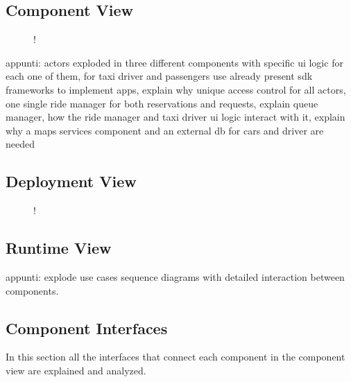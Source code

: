 \subsection{Component View}
\label{sec:component-view}
\begin{figure}[H]
	\centering
	\resizebox{6in}
	{!}{}
\end{figure}
appunti: actors exploded in three different components with specific ui logic for each one of them, for taxi driver and passengers use already present sdk frameworks to implement apps, explain why unique access control for all actors, one single ride manager for both reservations and requests, explain queue manager, how the ride manager and taxi driver ui logic interact with it, explain why a maps services component and an external db for cars and driver are needed
\subsection{Deployment View}
\begin{figure}[H]
	\centering
	\resizebox{6in}
	{!}{}
\end{figure}
\subsection{Runtime View}
appunti: explode use cases sequence diagrams with detailed interaction between components.
\subsection{Component Interfaces}
In this section all the interfaces that connect each component in the component view are explained and analyzed.
